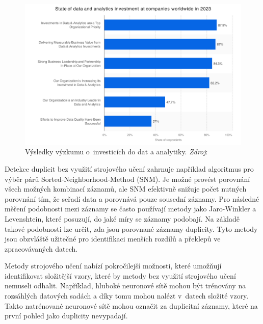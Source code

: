 \begin{figure}[htb]
  \centering
  \includegraphics[width=\textwidth]{images/statista-global-state-of-data-and-analytics-investment-2023.pdf}
  \caption{Výsledky výzkumu o~investicích do dat a analytiky. \newline
    \textit{Zdroj}: \cite{newvantage_partners_global_2024}}
  \label{fig:google-trends}
\end{figure}


Detekce duplicit bez využití strojového učení zahrnuje například algoritmus pro výběr párů Sorted-Neighborhood-Method (SNM). Je možné provést porovnání všech možných kombinací záznamů, ale SNM efektivně snižuje počet nutných porovnání tím, že seřadí data a porovnává pouze sousední záznamy. Pro následné měření podobnosti mezi záznamy se často používají metody jako Jaro-Winkler a Levenshtein, které posuzují, do jaké míry se záznamy podobají. Na základě takové podobnosti lze určit, zda jsou porovnané záznamy duplicity. Tyto metody jsou obzvláště užitečné pro identifikaci menších rozdílů a překlepů ve zpracovávaných datech. \cite{draisbach_choosing_2013}

Metody strojového učení nabízí pokročilejší možnosti, které umožňují identifikovat složitější vzory, které by metody bez využití strojového učení nemuseli odhalit. Například, hluboké neuronové sítě mohou být trénovány na rozsáhlých datových sadách a díky tomu mohou nalézt v~datech složité vzory. Takto natrénované neuronové sítě mohou označit za duplicitní záznamy, které na první pohled jako duplicity nevypadají. \cite{pasek_mqdd_2022}

